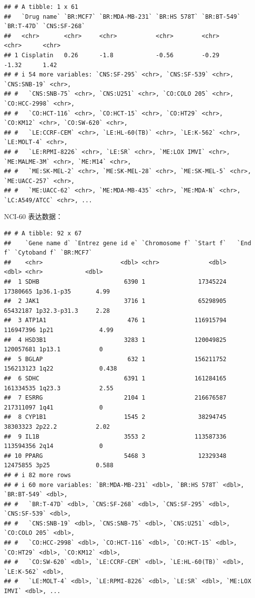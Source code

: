 \documentclass[
]{article}
\begin{document}
\begin{verbatim}
## # A tibble: 1 x 61
##   `Drug name` `BR:MCF7` `BR:MDA-MB-231` `BR:HS 578T` `BR:BT-549` `BR:T-47D` `CNS:SF-268`
##   <chr>       <chr>     <chr>           <chr>        <chr>       <chr>      <chr>       
## 1 Cisplatin   0.26      -1.8            -0.56        -0.29       -1.32      1.42        
## # i 54 more variables: `CNS:SF-295` <chr>, `CNS:SF-539` <chr>, `CNS:SNB-19` <chr>,
## #   `CNS:SNB-75` <chr>, `CNS:U251` <chr>, `CO:COLO 205` <chr>, `CO:HCC-2998` <chr>,
## #   `CO:HCT-116` <chr>, `CO:HCT-15` <chr>, `CO:HT29` <chr>, `CO:KM12` <chr>, `CO:SW-620` <chr>,
## #   `LE:CCRF-CEM` <chr>, `LE:HL-60(TB)` <chr>, `LE:K-562` <chr>, `LE:MOLT-4` <chr>,
## #   `LE:RPMI-8226` <chr>, `LE:SR` <chr>, `ME:LOX IMVI` <chr>, `ME:MALME-3M` <chr>, `ME:M14` <chr>,
## #   `ME:SK-MEL-2` <chr>, `ME:SK-MEL-28` <chr>, `ME:SK-MEL-5` <chr>, `ME:UACC-257` <chr>,
## #   `ME:UACC-62` <chr>, `ME:MDA-MB-435` <chr>, `ME:MDA-N` <chr>, `LC:A549/ATCC` <chr>, ...
\end{verbatim}

NCI-60 表达数据：

\begin{verbatim}
## # A tibble: 92 x 67
##    `Gene name d` `Entrez gene id e` `Chromosome f` `Start f`   `End f` `Cytoband f` `BR:MCF7`
##    <chr>                      <dbl> <chr>              <dbl>     <dbl> <chr>            <dbl>
##  1 SDHB                        6390 1               17345224  17380665 1p36.1-p35       4.99 
##  2 JAK1                        3716 1               65298905  65432187 1p32.3-p31.3     2.28 
##  3 ATP1A1                       476 1              116915794 116947396 1p21             4.99 
##  4 HSD3B1                      3283 1              120049825 120057681 1p13.1           0    
##  5 BGLAP                        632 1              156211752 156213123 1q22             0.438
##  6 SDHC                        6391 1              161284165 161334535 1q23.3           2.55 
##  7 ESRRG                       2104 1              216676587 217311097 1q41             0    
##  8 CYP1B1                      1545 2               38294745  38303323 2p22.2           2.02 
##  9 IL1B                        3553 2              113587336 113594356 2q14             0    
## 10 PPARG                       5468 3               12329348  12475855 3p25             0.588
## # i 82 more rows
## # i 60 more variables: `BR:MDA-MB-231` <dbl>, `BR:HS 578T` <dbl>, `BR:BT-549` <dbl>,
## #   `BR:T-47D` <dbl>, `CNS:SF-268` <dbl>, `CNS:SF-295` <dbl>, `CNS:SF-539` <dbl>,
## #   `CNS:SNB-19` <dbl>, `CNS:SNB-75` <dbl>, `CNS:U251` <dbl>, `CO:COLO 205` <dbl>,
## #   `CO:HCC-2998` <dbl>, `CO:HCT-116` <dbl>, `CO:HCT-15` <dbl>, `CO:HT29` <dbl>, `CO:KM12` <dbl>,
## #   `CO:SW-620` <dbl>, `LE:CCRF-CEM` <dbl>, `LE:HL-60(TB)` <dbl>, `LE:K-562` <dbl>,
## #   `LE:MOLT-4` <dbl>, `LE:RPMI-8226` <dbl>, `LE:SR` <dbl>, `ME:LOX IMVI` <dbl>, ...
\end{verbatim}
\end{document}
